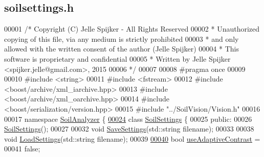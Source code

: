 \hypertarget{soilsettings_8h_source}{}\subsection{soilsettings.\+h}
\label{soilsettings_8h_source}

\begin{DoxyCode}
00001 \textcolor{comment}{/* Copyright (C) Jelle Spijker - All Rights Reserved}
00002 \textcolor{comment}{ * Unauthorized copying of this file, via any medium is strictly prohibited}
00003 \textcolor{comment}{ * and only allowed with the written consent of the author (Jelle Spijker)}
00004 \textcolor{comment}{ * This software is proprietary and confidential}
00005 \textcolor{comment}{ * Written by Jelle Spijker <spijker.jelle@gmail.com>, 2015}
00006 \textcolor{comment}{ */}
00007 
00008 \textcolor{preprocessor}{#pragma once}
00009 
00010 \textcolor{preprocessor}{#include <string>}
00011 \textcolor{preprocessor}{#include <fstream>}
00012 \textcolor{preprocessor}{#include <boost/archive/xml\_iarchive.hpp>}
00013 \textcolor{preprocessor}{#include <boost/archive/xml\_oarchive.hpp>}
00014 \textcolor{preprocessor}{#include <boost/serialization/version.hpp>}
00015 \textcolor{preprocessor}{#include "../SoilVision/Vision.h"}
00016 
00017 \textcolor{keyword}{namespace }\hyperlink{namespace_soil_analyzer}{SoilAnalyzer} \{
\hypertarget{soilsettings_8h_source_l00024}{}\hyperlink{class_soil_analyzer_1_1_soil_settings}{00024} \textcolor{keyword}{class }\hyperlink{class_soil_analyzer_1_1_soil_settings}{SoilSettings} \{
00025 \textcolor{keyword}{public}:
00026   \hyperlink{class_soil_analyzer_1_1_soil_settings_ab8359b9a5ea27e6296e79a82789c8719}{SoilSettings}();
00027 
00032   \textcolor{keywordtype}{void} \hyperlink{class_soil_analyzer_1_1_soil_settings_ab211c361df454e8e1e29a4bddedeba81}{SaveSettings}(std::string filename);
00033 
00038   \textcolor{keywordtype}{void} \hyperlink{class_soil_analyzer_1_1_soil_settings_a438bf660eeb7a49a676eef5da129f8d5}{LoadSettings}(std::string filename);
00039 
\hypertarget{soilsettings_8h_source_l00040}{}\hyperlink{class_soil_analyzer_1_1_soil_settings_a0e27335d05aed8f3f084744062368578}{00040}   \textcolor{keywordtype}{bool} \hyperlink{class_soil_analyzer_1_1_soil_settings_a0e27335d05aed8f3f084744062368578}{useAdaptiveContrast} =
00041       \textcolor{keyword}{false}; 

\end{DoxyCode}
